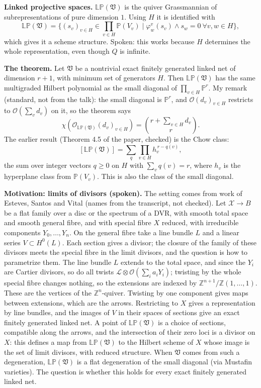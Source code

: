 \medskip\noindent
{\bf Linked projective spaces.}
$\mathbb{LP}(\mathfrak{V})$ is the quiver
Grassmannian of subrepresentations of pure
dimension $1$. Using $H$ it is identified
with
$$
\mathbb{LP}(\mathfrak{V})
=\{(s_v)_{v\in H}\in
\prod_{v\in H}\mathbb{P}(V_v) \mid
\varphi^v_w(s_v)\wedge s_w=0
\ \forall v,w\in H\},
$$
which gives it a scheme structure. Spoken:
this works because $H$ determines the whole
representation, even though $Q$ is infinite.

\medskip\noindent
{\bf The theorem.} Let $\mathfrak{V}$ be a
nontrivial exact finitely generated linked
net of dimension $r+1$, with minimum set of
generators $H$. Then
$\mathbb{LP}(\mathfrak{V})$ has the same
multigraded Hilbert polynomial as the small
diagonal of $\prod_{v\in H}\mathbb{P}^r$. My
remark (standard, not from the talk): the
small diagonal is $\mathbb{P}^r$, and
$\mathcal{O}(d_v)_{v\in H}$ restricts to
$\mathcal{O}(\sum_v d_v)$ on it, so the
theorem says
$$
\chi\left(
\mathcal{O}_{\mathbb{LP}(\mathfrak{V})}
(d_v)_{v\in H}\right)
=\binom{r+\sum_{v\in H}d_v}{r}.
$$
The earlier result (Theorem 4.5 of the paper,
checked) is the Chow class:
$$
[\mathbb{LP}(\mathfrak{V})]
=\sum_{q}\prod_{v\in H}h_v^{\,r-q(v)},
$$
the sum over integer vectors $q\geq 0$ on $H$
with $\sum_v q(v)=r$, where $h_v$ is the
hyperplane class from $\mathbb{P}(V_v)$. This
is also the class of the small diagonal.

\medskip\noindent
{\bf Motivation: limits of divisors
(spoken).} The setting comes from work of
Esteves, Santos and Vital (names from the
transcript, not checked). Let $\mathcal{X}\to
B$ be a flat family over a disc or the
spectrum of a DVR, with smooth total space
and smooth general fibre, and with special
fibre $X$ reduced, with irreducible
components $Y_0,\dots,Y_n$. On the general
fibre take a line bundle $L$ and a linear
series $V\subset H^0(L)$. Each section gives
a divisor; the closure of the family of these
divisors meets the special fibre in the limit
divisors, and the question is how to
parametrize them. The line bundle $L$ extends
to the total space, and since the $Y_i$ are
Cartier divisors, so do all twists
$\mathcal{L}\otimes\mathcal{O}(\sum_i
a_iY_i)$; twisting by the whole special fibre
changes nothing, so the extensions are
indexed by
$\mathbb{Z}^{n+1}/\mathbb{Z}(1,\dots,1)$.
These are the vertices of the
$\mathbb{Z}^n$-quiver. Twisting by one
component gives maps between extensions,
which are the arrows. Restricting to $X$
gives a representation by line bundles, and
the images of $V$ in their spaces of sections
give an exact finitely generated linked net.
A point of $\mathbb{LP}(\mathfrak{V})$ is a
choice of sections, compatible along the
arrows, and the intersection of their zero
loci is a divisor on $X$: this defines a map
from $\mathbb{LP}(\mathfrak{V})$ to the
Hilbert scheme of $X$ whose image is the set
of limit divisors, with reduced structure.
When $\mathfrak{V}$ comes from such a
degeneration, $\mathbb{LP}(\mathfrak{V})$ is
a flat degeneration of the small diagonal
(via Mustafin varieties). The question is
whether this holds for every exact finitely
generated linked net.

